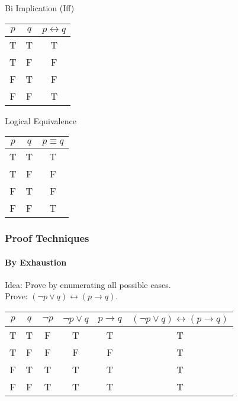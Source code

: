 \documentclass[usenames,dvipsnames]{beamer}
\begin{document}
\begin{frame}[fragile]
\begin{minipage}{0.32\textwidth}
  \end{minipage}
  \begin{minipage}{0.32\textwidth}
    $\;$ \\
    Bi Implication (Iff) \\
    \begin{tabular}{| c | c | c |}
    \hline
    $p$ & $q$ & $p \leftrightarrow q$ \\
    \hline
    T & T & T \\
    T & F & F \\
    F & T & F \\
    F & F & T \\
    \hline
    \end{tabular}
  \end{minipage}
  \begin{minipage}{0.32\textwidth}
    $\;$ \\
    Logical Equivalence \\
    \begin{tabular}{| c | c | c |}
    \hline
    $p$ & $q$ & $p \equiv q$ \\
    \hline
    T & T & T \\
    T & F & F \\
    F & T & F \\
    F & F & T \\
    \hline
    \end{tabular}
  \end{minipage}
\end{frame}

\begin{frame}[fragile]
  \frametitle{Proof Techniques}
  \framesubtitle{By Exhaustion}
  Idea: Prove by enumerating all possible cases. \\
  Prove: $(\lnot p \lor q) \leftrightarrow (p \rightarrow q)$.
  \begin{tabular}{| c | c | c | c | c | c |}
  \hline
  $p$ & $q$ & $\lnot p$ & $ \lnot p \lor q$ & $p \rightarrow q$
      & $(\lnot p \lor q) \leftrightarrow (p \rightarrow q)$ \\
  \hline
  T & T & F & T & T & T \\
  T & F & F & F & F & T \\
  F & T & T & T & T & T \\
  F & F & T & T & T & T \\
  \hline
  \end{tabular}
\end{frame}
\end{document}
